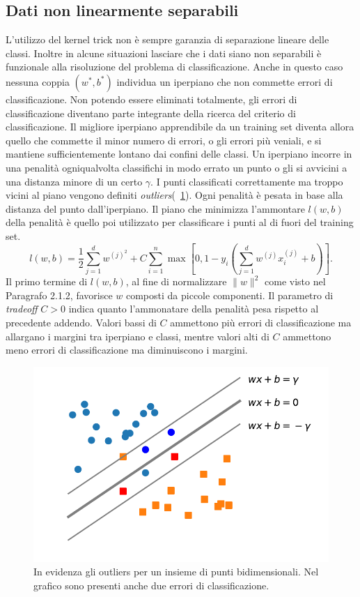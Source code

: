 \documentclass [11pt,a4paper,twoside,openright] {book}
\begin{document}
\subsection{Dati non linearmente separabili}
L'utilizzo del kernel trick non è sempre garanzia di separazione lineare delle classi. Inoltre in alcune situazioni lasciare che i dati siano non separabili è funzionale alla risoluzione del problema di classificazione. Anche in questo caso nessuna coppia $(w^*,b^*)$ individua un iperpiano che non commette errori di classificazione. Non potendo essere eliminati totalmente, gli errori di classificazione diventano parte integrante della ricerca del criterio di classificazione. Il migliore iperpiano apprendibile da un training set diventa allora quello che commette il minor numero di errori, o gli errori più veniali, e si mantiene sufficientemente lontano dai confini delle classi. Un iperpiano incorre in una penalità ogniqualvolta classifichi in modo errato un punto o gli si avvicini a una distanza minore di un certo $\gamma$. I punti classificati correttamente ma troppo vicini al piano vengono definiti \textit{outliers}(\figurename~\ref{outliers}). Ogni penalità è pesata in base alla distanza del punto dall'iperpiano. Il piano che minimizza l'ammontare $l(w,b)$ della penalità è quello poi utilizzato per classificare i punti al di fuori del training set.
\begin{equation}
l(w,b)= \dfrac{1}{2} \sum_{j=1}^d w^{(j)^2} + C \sum_{i=1}^n \max[0, 1 - y_i(\sum_{j=1}^d w^{(j)} x_i^{(j)} + b)].
\end{equation}
Il primo termine di $l(w,b)$, al fine di normalizzare $\parallel w \parallel ^2$ come visto nel Paragrafo 2.1.2, favorisce $w$ composti da piccole componenti. Il parametro di \textit{tradeoff} $C > 0$ indica quanto l'ammonatare della penalità pesa rispetto al precedente addendo. Valori bassi di $C$ ammettono più errori di classificazione ma allargano i margini tra iperpiano e classi, mentre valori alti di $C$ ammettono meno errori di classificazione ma diminuiscono i margini.
\begin{figure}[H]
\centering
\includegraphics[scale=.7]{figure/outliers.pdf}
\caption{In evidenza gli outliers per un insieme di punti bidimensionali. Nel grafico sono presenti anche due errori di classificazione. \label{outliers}}
\end{figure}
\end{document}
